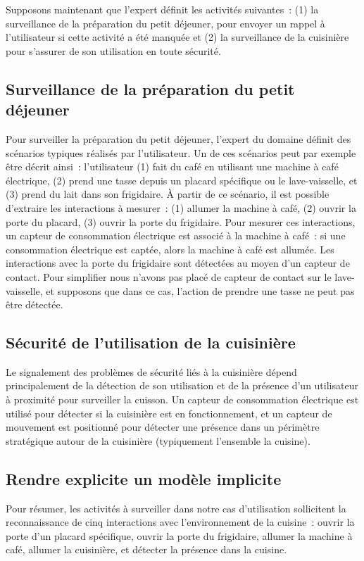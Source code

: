 Supposons maintenant que l'expert définit les activités suivantes~: (1) la 
surveillance de la préparation du petit déjeuner, pour envoyer un rappel à 
l'utilisateur si cette activité a été manquée et (2) la surveillance de la 
cuisinière pour s'assurer de son utilisation en toute sécurité.

\subsection{Surveillance de la préparation du petit déjeuner}
Pour surveiller la préparation du petit déjeuner, l'expert du domaine définit 
des scénarios typiques réalisés par l'utilisateur. 
Un de ces scénarios peut par exemple être décrit ainsi~: l'utilisateur (1) fait 
du café en utilisant une machine à café électrique, (2) prend une tasse depuis 
un placard spécifique ou le lave-vaisselle, et (3) prend du lait dans son frigidaire. 
À partir de ce scénario, il est possible d'extraire les interactions à 
mesurer~: (1) allumer la machine à café, (2) ouvrir la porte du placard, 
(3) ouvrir la porte du frigidaire. Pour mesurer ces interactions, un capteur de 
consommation électrique est associé à la machine à café~: si une consommation 
électrique est captée, alors la machine à café est allumée. Les interactions 
avec la porte du frigidaire sont détectées au moyen d'un 
capteur de contact. Pour simplifier nous n'avons pas placé de capteur de 
contact sur le lave-vaisselle, et supposons que dans ce cas, l'action de prendre 
une tasse ne peut pas être détectée.

\subsection{Sécurité de l'utilisation de la cuisinière}
Le signalement des problèmes de sécurité liés à la cuisinière dépend principalement de la détection de son 
utilisation et de la présence d'un utilisateur à proximité pour surveiller 
la cuisson. Un capteur de consommation électrique est utilisé pour détecter 
si la cuisinière est en fonctionnement, et un capteur de mouvement est positionné pour 
détecter une présence dans un périmètre stratégique autour de la cuisinière 
(typiquement l'ensemble la cuisine).

\subsection{Rendre explicite un modèle implicite}
Pour résumer, les activités à surveiller dans notre cas d'utilisation 
sollicitent la reconnaissance de cinq interactions avec l'environnement de la 
cuisine~: 
ouvrir la porte d'un placard spécifique, 
ouvrir la porte du frigidaire, 
allumer la machine à café, allumer la cuisinière, et détecter la présence dans 
la cuisine.

